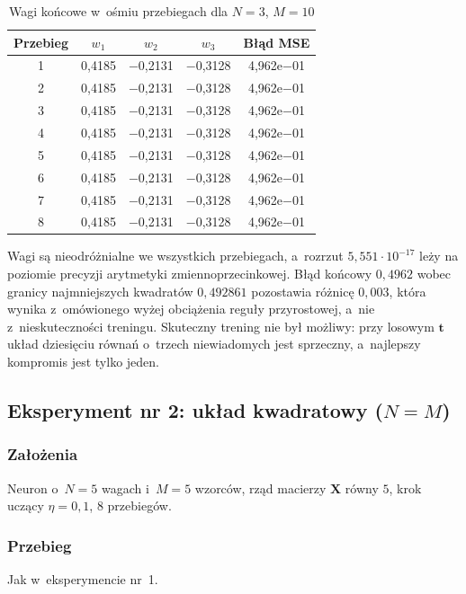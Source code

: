 \documentclass[12pt]{article}
\begin{document}
\begin{table}[h]
\centering
\caption{Wagi końcowe w~ośmiu przebiegach dla $N=3$, $M=10$}
\label{tab:nm1}
\begin{tabular}{ccccc}
\toprule
\textbf{Przebieg} & $w_1$ & $w_2$ & $w_3$ & \textbf{Błąd MSE} \\
\midrule
1 & 0,4185 & $-$0,2131 & $-$0,3128 & 4,962e$-$01 \\
2 & 0,4185 & $-$0,2131 & $-$0,3128 & 4,962e$-$01 \\
3 & 0,4185 & $-$0,2131 & $-$0,3128 & 4,962e$-$01 \\
4 & 0,4185 & $-$0,2131 & $-$0,3128 & 4,962e$-$01 \\
5 & 0,4185 & $-$0,2131 & $-$0,3128 & 4,962e$-$01 \\
6 & 0,4185 & $-$0,2131 & $-$0,3128 & 4,962e$-$01 \\
7 & 0,4185 & $-$0,2131 & $-$0,3128 & 4,962e$-$01 \\
8 & 0,4185 & $-$0,2131 & $-$0,3128 & 4,962e$-$01 \\
\bottomrule
\end{tabular}
\end{table}

Wagi są nieodróżnialne we wszystkich przebiegach, a~rozrzut $5{,}551\cdot10^{-17}$
leży na poziomie precyzji arytmetyki zmiennoprzecinkowej. Błąd końcowy $0{,}4962$ wobec granicy najmniejszych kwadratów $0{,}492861$
pozostawia różnicę $0{,}003$, która wynika z~omówionego wyżej obciążenia reguły
przyrostowej, a~nie z~nieskuteczności treningu.
Skuteczny trening nie był możliwy: przy losowym $\mathbf{t}$ układ dziesięciu równań
o~trzech niewiadomych jest sprzeczny, a~najlepszy kompromis jest tylko jeden.

\subsection{Eksperyment nr 2: układ kwadratowy \mbox{($N = M$)}}

\subsubsection{Założenia}
Neuron o~$N=5$ wagach i~$M=5$ wzorców, rząd macierzy $\mathbf{X}$ równy $5$, krok uczący $\eta = 0{,}1$, 8 przebiegów.

\subsubsection{Przebieg}
Jak w~eksperymencie nr~1.
\end{document}
